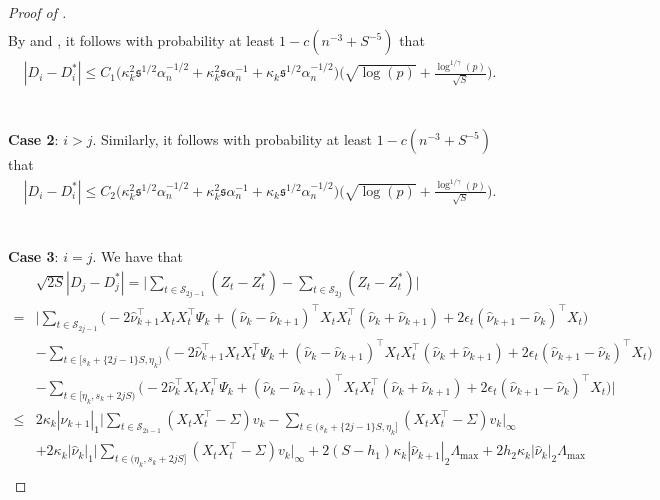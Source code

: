\documentclass[11pt]{article}
\newcommand{\s}{ { \mathfrak{s}  } }
\theoremstyle{plain}
\theoremstyle{definition}
\begin{document}
\begin{proof}[Proof of ]
\begin{align*}
\end{align*}
By  and , it follows with probability at least $1 - c(n^{-3} + S^{-5})$ that
\begin{align*}
    |D_i - D_i^*| \leq C_1\big(\kappa_k^2\s^{1/2}\alpha_n^{-1/2} + \kappa_k^2\s\alpha_n^{-1} + \kappa_k\s^{1/2}\alpha_n^{-1/2}\big)\bigg( \sqrt{\log(p)} + \frac{\log^{1/\gamma}(p)}{\sqrt{S}} \bigg).
\end{align*}
\\
\\
\textbf{Case 2}: $i > j$. Similarly, it follows with probability at least $1 - c(n^{-3} + S^{-5})$ that
\begin{align*}
    |D_i - D_i^*| \leq C_2\big(\kappa_k^2\s^{1/2}\alpha_n^{-1/2} + \kappa_k^2\s\alpha_n^{-1} + \kappa_k\s^{1/2}\alpha_n^{-1/2}\big)\bigg( \sqrt{\log(p)} + \frac{\log^{1/\gamma}(p)}{\sqrt{S}} \bigg).
\end{align*}
\\
\\
\textbf{Case 3}: $i = j$. We have that
\begin{align*}
    &\sqrt{2S}|D_j - D_j^*| = \bigg|\sum_{t \in \mathcal{S}_{2j-1}}(Z_t - Z_t^*) - \sum_{t \in \mathcal{S}_{2j}}(Z_t - Z_t^*)\bigg|\\
    =& \bigg|\sum_{t \in \mathcal{S}_{2j-1}}\big(-2\widehat{ \nu}_{k+1}^{\top}X_tX_t^{\top}\Psi_k + (\widehat{ \nu}_k -\widehat{ \nu}_{k+1})^{\top}X_tX_t^{\top}(\widehat{ \nu}_k +\widehat{ \nu}_{k+1}) + 2\epsilon_t(\widehat{ \nu}_{k+1} - \widehat{ \nu}_k)^{\top}X_t\big)\\
    &- \sum_{t \in [s_k+\{2j-1\}S, \eta_k)}\big(-2\widehat{ \nu}_{k+1}^{\top}X_tX_t^{\top}\Psi_k + (\widehat{ \nu}_k -\widehat{ \nu}_{k+1})^{\top}X_tX_t^{\top}(\widehat{ \nu}_k +\widehat{ \nu}_{k+1}) + 2\epsilon_t(\widehat{ \nu}_{k+1} - \widehat{ \nu}_k)^{\top}X_t\big)\\
    &- \sum_{t \in [\eta_k, s_k+2jS)}\big(-2\widehat{ \nu}_{k}^{\top}X_tX_t^{\top}\Psi_k + (\widehat{ \nu}_k -\widehat{ \nu}_{k+1})^{\top}X_tX_t^{\top}(\widehat{ \nu}_k +\widehat{ \nu}_{k+1}) + 2\epsilon_t(\widehat{ \nu}_{k+1} - \widehat{ \nu}_k)^{\top}X_t\big)\bigg|\\
    \leq& 2\kappa_k|\widehat{ \nu}_{k+1}|_1\bigg|\sum_{t \in \mathcal{S}_{2i-1}}(X_tX_t^{\top} - \Sigma)v_k - \sum_{t \in (s_k+\{2j-1\}S, \eta_k]}(X_tX_t^{\top} - \Sigma)v_k\bigg|_{\infty}\\
    &+ 2\kappa_k|\widehat{ \nu}_{k}|_1\bigg|\sum_{t \in (\eta_k, s_k+2jS]}(X_tX_t^{\top} - \Sigma)v_k\bigg|_{\infty} + 2(S-h_1)\kappa_k| \widehat{\nu}_{k+1}|_2 \Lambda_{\max} + 2h_2\kappa_k| \widehat{\nu}_{k}|_2 \Lambda_{\max}\\

\end{align*}
\end{proof}
\end{document}
